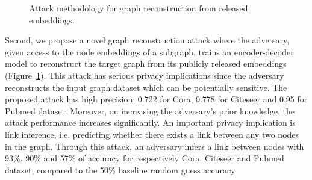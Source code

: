 \begin{figure}[!htb]
    \centering

    \caption{Attack methodology for graph reconstruction from released embeddings.}
    \label{fig:recattack}
\end{figure}

Second, we propose a novel graph reconstruction attack where the adversary, given access to the node embeddings of a subgraph, trains an encoder-decoder model to reconstruct the target graph from its publicly released embeddings (Figure~\ref{fig:recattack}).
This attack has serious privacy implications since the adversary reconstructs the input graph dataset which can be potentially sensitive.
The proposed attack has high precision: 0.722 for Cora, 0.778 for Citeseer and 0.95 for Pubmed dataset.
Moreover, on increasing the adversary's prior knowledge, the attack performance increases significantly.
An important privacy implication is link inference, i.e, predicting whether there exists a link between any two nodes in the graph.
Through this attack, an adversary infers a link between nodes with 93\%, 90\% and 57\% of accuracy for respectively Cora, Citeseer and Pubmed dataset, compared to the 50\% baseline random guess accuracy.




